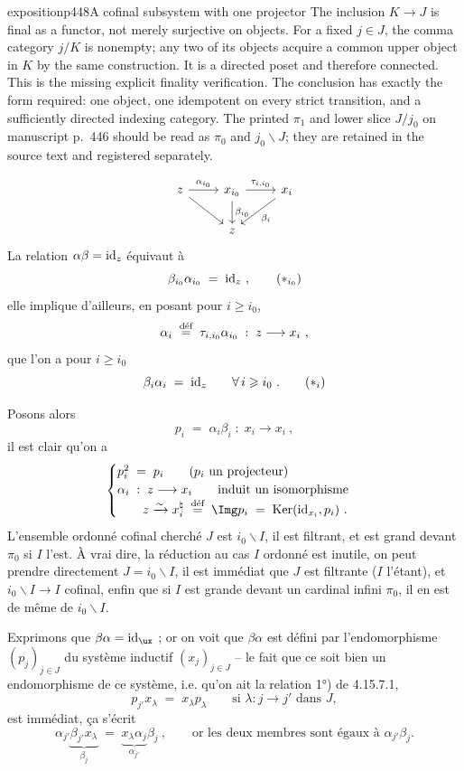 \begin{dcomment}{exposition}{p448}{A cofinal subsystem with one projector}
The inclusion $K\to J$ is final as a functor, not merely surjective on objects. For a fixed $j\in J$, the comma category $j/K$ is nonempty; any two of its objects acquire a common upper object in $K$ by the same construction. It is a directed poset and therefore connected. This is the missing explicit finality verification. The conclusion has exactly the form required: one object, one idempotent on every strict transition, and a sufficiently directed indexing category. The printed $\pi_1$ and lower slice $J/j_0$ on manuscript p.~446 should be read as $\pi_0$ and $j_0\backslash J$; they are retained in the source text and registered separately.
\end{dcomment}


\[
\begin{tikzcd}
z \arrow[r, "\alpha_{i_0}"] \arrow[dr] & x_{i_0} \arrow[r, "\tau_{i,i_0}"] \arrow[d, "\beta_{i_0}"] & x_i \arrow[dl, "\beta_i"] \\
 & z &
\end{tikzcd}
\]
La relation $\alpha\beta = \id_z$ équivaut à
\[
\beta_{i_0}\alpha_{i_0} \;=\; \id_z\ , \tag*{$(*_{i_0})$}
\]
elle implique d'ailleurs, en posant pour $i \geqslant i_0$,
\[
\alpha_i \;\defeq\; \tau_{i,i_0}\alpha_{i_0} \;:\; z \longrightarrow x_i\ ,
\]
que l'on a pour $i \geqslant i_0$
\[
\beta_i\alpha_i \;=\; \id_z \qquad \forall\, i \geqslant i_0\ . \tag*{$(*_i)$}
\]

Posons alors
\[
p_i \;=\; \alpha_i\beta_i \;:\; x_i \longrightarrow x_i\ ,
\]
il est clair qu'on a
\[
\begin{cases}
p_i^2 \;=\; p_i \qquad \text{($p_i$ un projecteur)} \\
\alpha_i \;:\; z \longrightarrow x_i \qquad \text{induit un isomorphisme} \\
\qquad z \xrightarrow{\sim} x_i^\natural \;\defeq\; \Img p_i \;=\; \Ker(\id_{x_i},p_i)\ .
\end{cases}
\]
L'ensemble ordonné cofinal cherché $J$ est $i_0\backslash I$, il est filtrant, et est grand devant $\pi_0$ si $I$ l'est. À vrai dire, la réduction au cas $I$ ordonné est inutile, on peut prendre directement $J = i_0\backslash I$, il est immédiat que $J$ est filtrante ($I$ l'étant), et $i_0\backslash I \longrightarrow I$ cofinal, enfin que si $I$ est grande devant un cardinal infini $\pi_0$, il en est de même de $i_0\backslash I$.

Exprimons que $\beta\alpha = \id_{\ux}$ ; or on voit que $\beta\alpha$ est défini par l'endomorphisme $(p_j)_{j\in J}$ du système inductif $(x_j)_{j\in J}$ -- le fait que ce soit bien un endomorphisme de ce système, i.e. qu'on ait la relation 1°) de 4.15.7.1,
\[
p_{j'}x_\lambda \;=\; x_\lambda p_\lambda \qquad \text{si } \lambda : j \longrightarrow j' \text{ dans } J, %
\]
est immédiat, ça s'écrit
\[
\alpha_{j'}\underbrace{\beta_{j'}x_\lambda}_{\beta_j} \;=\; \underbrace{x_\lambda\alpha_j}_{\alpha_{j'}}\beta_j\ , \qquad \text{or les deux membres sont égaux à } \alpha_{j'}\beta_j.
\]

